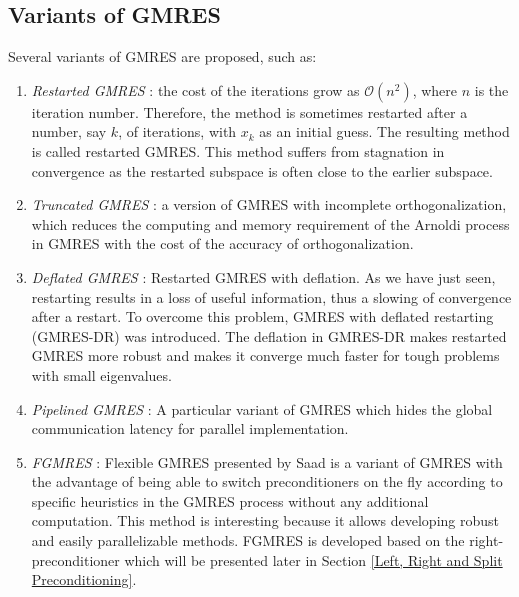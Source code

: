 \subsection{Variants of GMRES}

Several variants of GMRES are proposed, such as:

\begin{enumerate}
	\item \textit{Restarted GMRES} \cite{morgan1995restarted}: the cost of the iterations grow as $\mathcal{O}(n^2)$, where $n$ is the iteration number. Therefore, the method is sometimes restarted after a number, say $k$, of iterations, with $x_k$ as an initial guess. The resulting method is called restarted GMRES. This method suffers from stagnation in convergence as the restarted subspace is often close to the earlier subspace.
	
	\item \textit{Truncated GMRES} \cite{de1999truncation}: a version of GMRES with incomplete orthogonalization, which reduces the computing and memory requirement of the Arnoldi process in GMRES with the cost of the accuracy of orthogonalization.
	
	\item \textit{Deflated GMRES} \cite{erhel1996restarted}: Restarted GMRES with deflation. As we have just seen, restarting results in a loss of useful information, thus a slowing of convergence after a restart. To overcome this problem, GMRES with deflated restarting (GMRES-DR) was introduced. The deflation in GMRES-DR makes restarted GMRES more robust and makes it converge much faster for tough problems with small eigenvalues.
	
	\item \textit{Pipelined GMRES} \cite{ghysels2014hiding}: A particular variant of GMRES which hides the global communication latency for parallel implementation.
	
	\item \textit{FGMRES} \cite{fraysse2008algorithm}: Flexible GMRES presented by Saad is a variant of GMRES with the advantage of being able to switch preconditioners on the fly according to specific heuristics in the GMRES process without any additional computation. This method is interesting because it allows developing robust and easily parallelizable methods. FGMRES is developed based on the right-preconditioner which will be presented later in Section \ref{Left, Right and Split Preconditioning}.
	
\end{enumerate}

